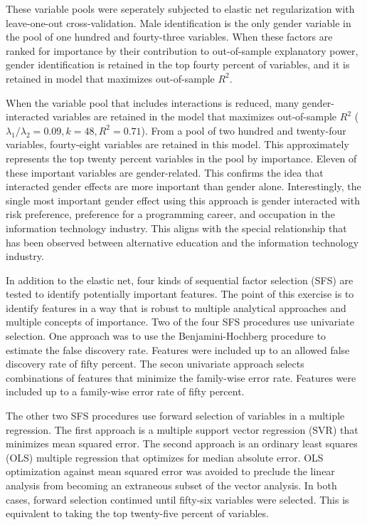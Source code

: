 \documentclass[review]{elsarticle}
\begin{document}
These variable pools were seperately subjected to elastic net regularization with leave-one-out cross-validation.
Male identification is the only gender variable in the pool of one hundred and fourty-three variables.
When these factors are ranked for importance by their contribution to out-of-sample explanatory power,
gender identification is retained in the top fourty percent of variables, and it is retained in model that maximizes out-of-sample $R^2$.

When the variable pool that includes interactions is reduced, many gender-interacted variables
are retained in the model that maximizes out-of-sample $R^2$ ($ \lambda_1 / \lambda_2 = 0.09, k = 48, R^2=0.71 $).
From a pool of two hundred and twenty-four variables, fourty-eight variables are retained in this model.
This approximately represents the top twenty percent variables in the pool by importance.
Eleven of these important variables are gender-related.
This confirms the idea that interacted gender effects are more important than gender alone.
Interestingly, the single most important gender effect using this approach is
gender interacted with risk preference,
preference for a programming career,
and occupation in the information technology industry.
This aligns with the special relationship that has been observed between alternative education and the information technology industry.

In addition to the elastic net, four kinds of sequential factor selection (SFS) are tested to identify potentially important features.
The point of this exercise is to identify features in a way that is robust to multiple analytical approaches and multiple concepts of importance.
Two of the four SFS procedures use univariate selection.
One approach was to use the Benjamini-Hochberg procedure to estimate the false discovery rate.
Features were included up to an allowed false discovery rate of fifty percent.
The secon univariate approach selects combinations of features that minimize the family-wise error rate.
Features were included up to a family-wise error rate of fifty percent.

The other two SFS procedures use forward selection of variables in a multiple regression.
The first approach is a multiple support vector regression (SVR) that minimizes mean squared error.
The second approach is an ordinary least squares (OLS) multiple regression that optimizes for median absolute error.
OLS optimization against mean squared error was avoided to preclude the linear analysis from becoming an extraneous subset of the vector analysis.
In both cases, forward selection continued until fifty-six variables were selected.
This is equivalent to taking the top twenty-five percent of variables.
\end{document}
